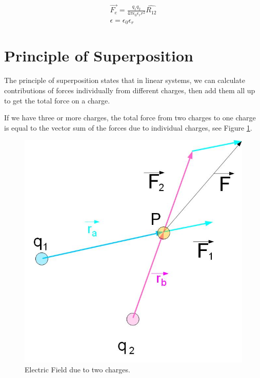 \documentclass{ximera}
\begin{document}
\begin{eqnarray}
\vec{F_e}=\frac{q_1 q_2}{4 \pi \epsilon_0 \epsilon_r r^2} \hat{R_{12}} \label{EqCoulombslaw3} \\
\epsilon = \epsilon_0 \epsilon_r
\end{eqnarray}



\section{Principle of Superposition}

The principle of superposition states that in linear systems, we can calculate contributions of forces individually from different charges, then add them all up to get the total force on a charge.

If we have three or more charges, the total force from two charges to one charge is equal to the vector sum of the forces due to individual charges, see Figure \ref{UnitCh}. 



\begin{figure}[htbp]
\begin{center}
\includegraphics[scale=0.5]{../jpg/superpositionFORCE.jpg}
\end{center}
\caption{Electric Field due to two charges.}
\label{UnitCh}
\end{figure}
\end{document}
